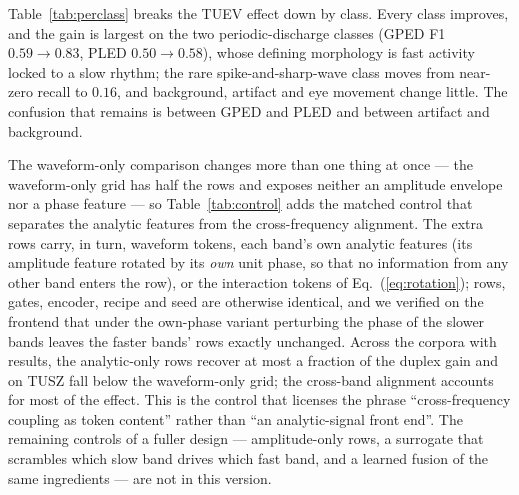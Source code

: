 Table~\ref{tab:perclass} breaks the TUEV effect down by class. Every
class improves, and the gain is largest on the two periodic-discharge
classes (GPED F1 $0.59 \to 0.83$, PLED $0.50 \to 0.58$), whose defining
morphology is fast activity locked to a slow rhythm; the rare
spike-and-sharp-wave class moves from near-zero recall to $0.16$, and
background, artifact and eye movement change little. The confusion that
remains is between GPED and PLED and between artifact and background.

The waveform-only comparison changes more than one thing at once ---
the waveform-only grid has half the rows and exposes neither an
amplitude envelope nor a phase feature --- so Table~\ref{tab:control}
adds the matched control that separates the analytic features from the
cross-frequency alignment. The extra rows carry, in turn, waveform
tokens, each band's own analytic features (its amplitude feature rotated
by its \emph{own} unit phase, so that no information from any other band
enters the row), or the interaction tokens of Eq.~(\ref{eq:rotation});
rows, gates, encoder, recipe and seed are otherwise identical, and we
verified on the frontend that under the own-phase variant perturbing the
phase of the slower bands leaves the faster bands' rows exactly
unchanged. Across the corpora with results, the analytic-only rows
recover at most a fraction of the duplex gain and on TUSZ fall below the
waveform-only grid; the cross-band alignment accounts for most of the
effect. This is the control that licenses the phrase ``cross-frequency
coupling as token content'' rather than ``an analytic-signal front end''.
The remaining controls of a fuller design --- amplitude-only rows, a
surrogate that scrambles which slow band drives which fast band, and a
learned fusion of the same ingredients --- are not in this version.

\begin{table}[t]
\centering
\scriptsize
\caption{Duplex vs.\ waveform-only tokenizer in the same encoder, seizure detection. Single seeds.}
\label{tab:abl-seizure}
\end{table}

